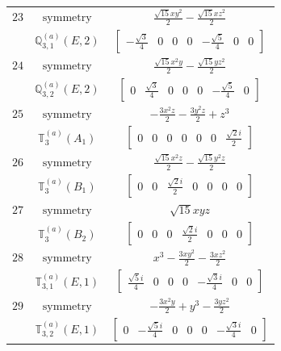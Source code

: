 \documentclass[fleqn,8pt,landscape]{jsarticle}
\begin{document}
\begin{longtable}{ccc}
$ 23 $ & $ \text{symmetry} $ & $ \frac{\sqrt{15} x y^{2}}{2} - \frac{\sqrt{15} x z^{2}}{2} $ \\
$  $ & $ \mathbb{Q}_{3,1}^{(a)}(E,2) $ & $ \begin{bmatrix} - \frac{\sqrt{3}}{4} & 0 & 0 & 0 & - \frac{\sqrt{5}}{4} & 0 & 0 \end{bmatrix} $ \\ \hline
$ 24 $ & $ \text{symmetry} $ & $ \frac{\sqrt{15} x^{2} y}{2} - \frac{\sqrt{15} y z^{2}}{2} $ \\
$  $ & $ \mathbb{Q}_{3,2}^{(a)}(E,2) $ & $ \begin{bmatrix} 0 & \frac{\sqrt{3}}{4} & 0 & 0 & 0 & - \frac{\sqrt{5}}{4} & 0 \end{bmatrix} $ \\ \hline
$ 25 $ & $ \text{symmetry} $ & $ - \frac{3 x^{2} z}{2} - \frac{3 y^{2} z}{2} + z^{3} $ \\
$  $ & $ \mathbb{T}_{3}^{(a)}(A_{1}) $ & $ \begin{bmatrix} 0 & 0 & 0 & 0 & 0 & 0 & \frac{\sqrt{2} i}{2} \end{bmatrix} $ \\ \hline
$ 26 $ & $ \text{symmetry} $ & $ \frac{\sqrt{15} x^{2} z}{2} - \frac{\sqrt{15} y^{2} z}{2} $ \\
$  $ & $ \mathbb{T}_{3}^{(a)}(B_{1}) $ & $ \begin{bmatrix} 0 & 0 & \frac{\sqrt{2} i}{2} & 0 & 0 & 0 & 0 \end{bmatrix} $ \\ \hline
$ 27 $ & $ \text{symmetry} $ & $ \sqrt{15} x y z $ \\
$  $ & $ \mathbb{T}_{3}^{(a)}(B_{2}) $ & $ \begin{bmatrix} 0 & 0 & 0 & \frac{\sqrt{2} i}{2} & 0 & 0 & 0 \end{bmatrix} $ \\ \hline
$ 28 $ & $ \text{symmetry} $ & $ x^{3} - \frac{3 x y^{2}}{2} - \frac{3 x z^{2}}{2} $ \\
$  $ & $ \mathbb{T}_{3,1}^{(a)}(E,1) $ & $ \begin{bmatrix} \frac{\sqrt{5} i}{4} & 0 & 0 & 0 & - \frac{\sqrt{3} i}{4} & 0 & 0 \end{bmatrix} $ \\ \hline
$ 29 $ & $ \text{symmetry} $ & $ - \frac{3 x^{2} y}{2} + y^{3} - \frac{3 y z^{2}}{2} $ \\
$  $ & $ \mathbb{T}_{3,2}^{(a)}(E,1) $ & $ \begin{bmatrix} 0 & - \frac{\sqrt{5} i}{4} & 0 & 0 & 0 & - \frac{\sqrt{3} i}{4} & 0 \end{bmatrix} $ \\ \hline

\end{longtable}
\end{document}
